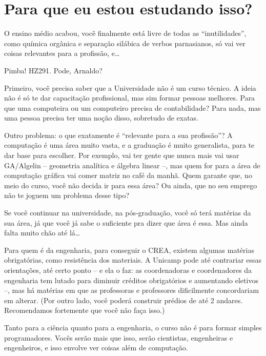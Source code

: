 
\section{Para que eu estou estudando isso?}

O ensino médio acabou, você finalmente está livre de todas as ``inutilidades'',
como química orgânica e separação silábica de verbos parnasianos, só vai ver
coisas relevantes para a profissão, e{\dots}

Pimba! HZ291. Pode, Arnaldo?

Primeiro, você precisa saber que a Universidade não é um curso técnico. A ideia
não é só te dar capacitação profissional, mas sim formar pessoas melhores. Para
que uma computeira ou um computeiro precisa de contabilidade? Para nada, mas
uma pessoa precisa ter uma noção disso, sobretudo de exatas.

Outro problema: o que exatamente é ``relevante para a sua profissão''?  A
computação é uma área muito vasta, e a graduação é muito generalista, para te
dar base para escolher. Por exemplo, vai ter gente que nunca mais vai usar
GA/Algelin -- geometria analítica e álgebra linear --, mas quem for para a área
de computação gráfica vai comer matriz no café da manhã. Quem garante que, no
meio do curso, você não decida ir para essa área? Ou ainda, que no seu emprego
não te joguem um problema desse tipo?

Se você continuar na universidade, na pós-graduação, você só terá matérias da
sua área, já que você já sabe o suficiente pra dizer que área é essa. Mas ainda
falta muito chão até lá{\dots}

Para quem é da engenharia, para conseguir o CREA, existem algumas matérias
obrigatórias, como resistência dos materiais. A Unicamp pode até contrariar
essas orientações, até certo ponto -- e ela o faz: as coordenadoras e
coordenadores da engenharia tem lutado para diminuir créditos obrigatórios e
aumentando eletivos --, mas há matérias em que as professoras e professores
dificilmente concordariam em alterar. (Por outro lado, você poderá construir
prédios de até 2 andares. Recomendamos fortemente que você não faça isso.)

Tanto para a ciência quanto para a engenharia, o curso não é para formar
simples programadores. Vocês serão mais que isso, serão cientistas, engenheiras
e engenheiros, e isso envolve ver coisas além de computação.
